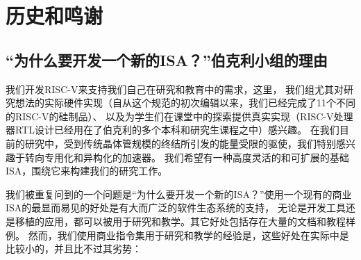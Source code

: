 \chapter{历史和鸣谢}
\label{history}

\section{“为什么要开发一个新的ISA？”伯克利小组的理由}

我们开发RISC-V来支持我们自己在研究和教育中的需求，这里，
我们组尤其对研究想法的实际硬件实现（自从这个规范的初次编辑以来，我们已经完成了11个不同的RISC-V的硅制品）、
以及为学生们在课堂中的探索提供真实实现（RISC-V处理器RTL设计已经用在了伯克利的多个本科和研究生课程之中）感兴趣。
在我们目前的研究中，受到传统晶体管规模的终结所引发的能量受限的驱使，我们特别感兴趣于转向专用化和异构化的加速器。
我们希望有一种高度灵活的和可扩展的基础ISA，围绕它来构建我们的研究工作。

我们被重复问到的一个问题是“为什么要开发一个新的ISA？”使用一个现有的商业ISA的最显而易见的好处是有大而广泛的软件生态系统的支持，
无论是开发工具还是移植的应用，都可以被用于研究和教学。其它好处包括存在大量的文档和教程样例。
然而，我们使用商业指令集用于研究和教学的经验是，这些好处在实际中是比较小的，并且比不过其劣势：

